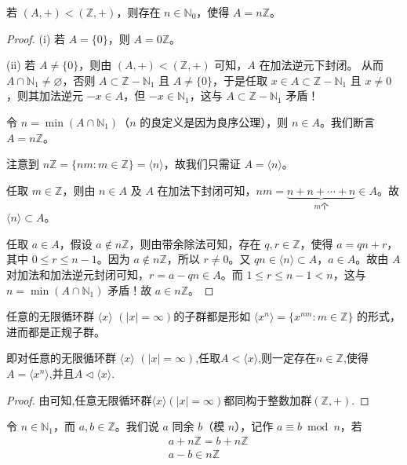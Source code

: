 \documentclass[../../main.tex]{subfiles}
\begin{document}
\begin{proposition}
若 $(A, +)<(\mathbb{Z}, +)$，则存在 $n\in\mathbb{N}_0$，使得 $A = n\mathbb{Z}$。
\end{proposition}
\begin{proof}
(i) 若 $A = \{0\}$，则 $A = 0\mathbb{Z}$。

(ii) 若 $A\neq\{0\}$，则由 $(A, +)<(\mathbb{Z}, +)$ 可知，$A$ 在加法逆元下封闭。
从而 $A\cap\mathbb{N}_1\neq\varnothing$，否则 $A\subset\mathbb{Z}-\mathbb{N}_1$ 且 $A\neq\{0\}$，于是任取 $x\in A\subset\mathbb{Z}-\mathbb{N}_1$ 且 $x\neq 0$，则其加法逆元 $-x\in A$，但 $-x\in\mathbb{N}_1$，这与 $A\subset\mathbb{Z}-\mathbb{N}_1$ 矛盾！

令 $n = \min(A\cap\mathbb{N}_1)$（$n$ 的良定义是因为良序公理），则 $n\in A$。我们断言 $A = n\mathbb{Z}$。

注意到 $n\mathbb{Z}=\{nm:m\in\mathbb{Z}\}=\langle n\rangle$，故我们只需证 $A = \langle n\rangle$。

任取 $m\in\mathbb{Z}$，则由 $n\in A$ 及 $A$ 在加法下封闭可知，$nm=\underset{m\text{个}}{\underbrace{n + n+\cdots + n}}\in A$。故 $\langle n\rangle\subset A$。

任取 $a\in A$，假设 $a\notin n\mathbb{Z}$，则由带余除法可知，存在 $q,r\in\mathbb{Z}$，使得 $a = qn + r$，其中 $0\leqslant r\leqslant n - 1$。因为 $a\notin n\mathbb{Z}$，所以 $r\neq 0$。又 $qn\in\langle n\rangle\subset A$，$a\in A$。故由 $A$ 对加法和加法逆元封闭可知，$r = a - qn\in A$。而 $1\leqslant r\leqslant n - 1 < n$，这与 $n = \min(A\cap\mathbb{N}_1)$ 矛盾！故 $a\in n\mathbb{Z}$。 
\end{proof}

\begin{corollary}
任意的无限循环群 $\langle x\rangle$ $(|x|=\infty)$的子群都是形如 $\langle x^n\rangle=\{x^{nm}:m\in\mathbb{Z}\}$ 的形式，进而都是正规子群。
 
即对任意的无限循环群 $\langle x\rangle$ $(|x|=\infty)$,任取$A<\langle x\rangle$,则一定存在$n\in \mathbb{Z}$,使得$A=\langle x^n\rangle$,并且$A\lhd \langle x\rangle$.
\end{corollary}
\begin{proof}
由可知,任意无限循环群$\langle x\rangle(|x|=\infty)$都同构于整数加群$(\mathbb{Z},+)$.
\end{proof}

\begin{definition}[同余(模$n$)]
令 $n\in \mathbb{N}_1$，而 $a,b\in \mathbb{Z}$。我们说 $a$ 同余 $b$（模 $n$），记作 $a\equiv b\bmod n$，若
\begin{align*}
&a + n\mathbb{Z}=b + n\mathbb{Z}\\
&a - b\in n\mathbb{Z}
\end{align*}
\end{definition}
\end{document}
